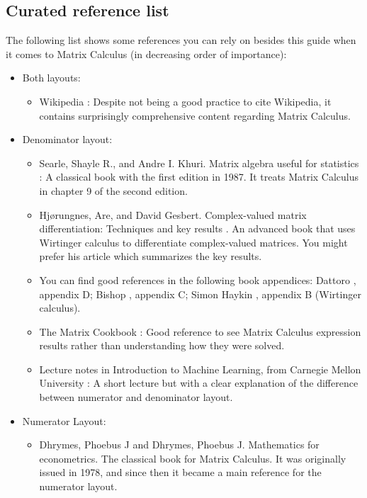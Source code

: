 \documentclass{article}
\begin{document}
\subsection{Curated reference list}
The following list shows some references you can rely on besides this guide when it comes to Matrix Calculus (in decreasing order of importance):
\begin{itemize}
    \item Both layouts:
    \begin{itemize}
	    \item Wikipedia \cite{Matrixca44:online}: Despite not being a good practice to cite Wikipedia, it contains surprisingly comprehensive content regarding Matrix Calculus.
    \end{itemize}
	\item Denominator layout:
    \begin{itemize}
        \item Searle, Shayle R., and Andre I. Khuri. Matrix algebra useful for statistics \cite{searle2017matrix}: A classical book with the first edition in 1987. It treats Matrix Calculus in chapter 9 of the second edition.
        \item Hj\o rungnes, Are, and David Gesbert. Complex-valued matrix differentiation: Techniques and key results \cite{hjorungnes2011complex}. An advanced book that uses Wirtinger calculus to differentiate complex-valued matrices. You might prefer his article \cite{hjorungnes2007complex} which summarizes the key results.
        \item You can find good references in the following book appendices: Dattoro \cite{dattorroConvexOptimizationEuclidean2010}, appendix D; Bishop \cite{bishopPatternRecognitionMachine2006}, appendix C; Simon Haykin \cite{haykin2009neural}, appendix B (Wirtinger calculus).
        \item The Matrix Cookbook \cite{petersen2008matrix}: Good reference to see Matrix Calculus expression results rather than understanding how they were solved.
        \item Lecture notes in Introduction to Machine Learning, from Carnegie Mellon University \cite{Singh}: A short lecture but with a clear explanation of the difference between numerator and denominator layout.
    \end{itemize}
    \item Numerator Layout:
    \begin{itemize}
        \item Dhrymes, Phoebus J and Dhrymes, Phoebus J. Mathematics for econometrics. The classical book for Matrix Calculus. It was originally issued in 1978, and since then it became a main reference for the numerator layout.

\end{itemize}
\end{itemize}
\end{document}
